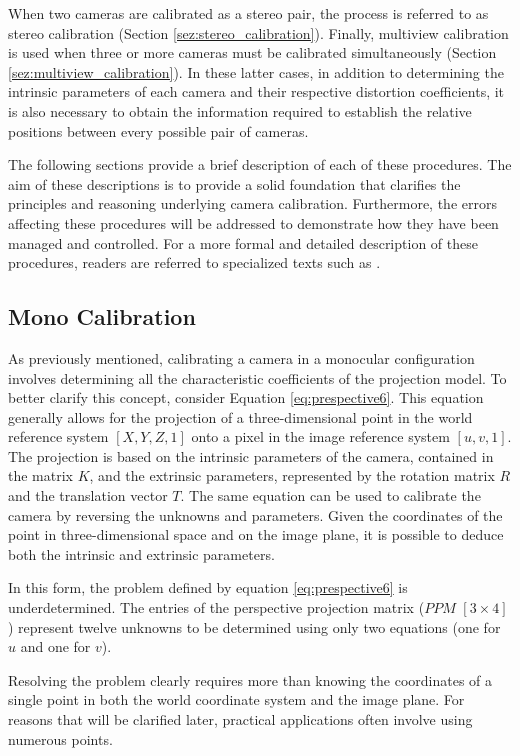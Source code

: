 When two cameras are calibrated as a stereo pair, the process is referred to as stereo calibration (Section \ref{sez:stereo_calibration}). Finally, multiview calibration is used when three or more cameras must be calibrated simultaneously (Section \ref{sez:multiview_calibration}). In these latter cases, in addition to determining the intrinsic parameters of each camera and their respective distortion coefficients, it is also necessary to obtain the information required to establish the relative positions between every possible pair of cameras.

The following sections provide a brief description of each of these procedures. The aim of these descriptions is to provide a solid foundation that clarifies the principles and reasoning underlying camera calibration. Furthermore, the errors affecting these procedures will be addressed to demonstrate how they have been managed and controlled.
For a more formal and detailed description of these procedures, readers are referred to specialized texts such as \cite{Hartley2003}.

\subsection{Mono Calibration}
\label{sez:mono_calibration}

As previously mentioned, calibrating a camera in a monocular configuration involves determining all the characteristic coefficients of the projection model. 
To better clarify this concept, consider Equation \ref{eq:prespective6}. This equation generally allows for the projection of a three-dimensional point in the world reference system $[X, Y, Z, 1]$ onto a pixel in the image reference system $[u, v, 1]$. The projection is based on the intrinsic parameters of the camera, contained in the matrix $K$, and the extrinsic parameters, represented by the rotation matrix $R$ and the translation vector $T$.
The same equation can be used to calibrate the camera by reversing the unknowns and parameters. Given the coordinates of the point in three-dimensional space and on the image plane, it is possible to deduce both the intrinsic and extrinsic parameters.

In this form, the problem defined by equation \ref{eq:prespective6} is underdetermined. The entries of the perspective projection matrix ($PPM$ $[3 \times 4]$) represent twelve unknowns to be determined using only two equations (one for $u$ and one for $v$). 

Resolving the problem clearly requires more than knowing the coordinates of a single point in both the world coordinate system and the image plane.  For reasons that will be clarified later, practical applications often involve using numerous points. 


